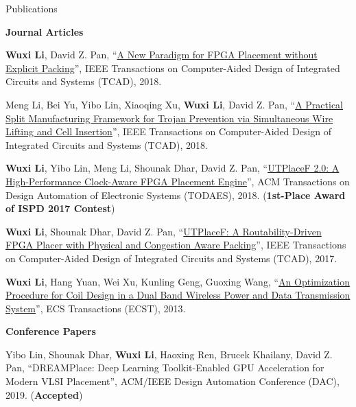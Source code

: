 \begin{rSection}{Publications}

\textbf{Journal Articles}
\begin{description}[font=\normalfont]
\item[{[J5]}]{
    \textbf{Wuxi Li}, David Z. Pan,
    ``\href{https://ieeexplore.ieee.org/document/8500228/}{A New Paradigm for FPGA Placement without Explicit Packing}'',
    IEEE Transactions on Computer-Aided Design of Integrated Circuits and Systems (TCAD), 2018.
}

\item[{[J4]}]{
    Meng Li, Bei Yu, Yibo Lin, Xiaoqing Xu, \textbf{Wuxi Li}, David Z. Pan,
    ``\href{https://ieeexplore.ieee.org/document/8419279/}{A Practical Split Manufacturing Framework for Trojan Prevention via Simultaneous Wire Lifting and Cell Insertion}'',
    IEEE Transactions on Computer-Aided Design of Integrated Circuits and Systems (TCAD), 2018.
}

\item[{[J3]}]{
    \textbf{Wuxi Li}, Yibo Lin, Meng Li, Shounak Dhar, David Z. Pan,
    ``\href{https://dl.acm.org/citation.cfm?id=3174849}{UTPlaceF 2.0: A High-Performance Clock-Aware FPGA Placement Engine}'',
    ACM Transactions on Design Automation of Electronic Systems (TODAES), 2018.
    (\textbf{1st-Place Award of ISPD 2017 Contest})
}

\item[{[J2]}]{
    \textbf{Wuxi Li}, Shounak Dhar, David Z. Pan,
    ``\href{http://ieeexplore.ieee.org/document/7984833/}{UTPlaceF: A Routability-Driven FPGA Placer with Physical and Congestion Aware Packing}'',
    IEEE Transactions on Computer-Aided Design of Integrated Circuits and Systems (TCAD), 2017.
}

\item[{[J1]}]{
    \textbf{Wuxi Li}, Hang Yuan, Wei Xu, Kunling Geng, Guoxing Wang,
    ``\href{http://ecst.ecsdl.org/content/52/1/1091.short}{An Optimization Procedure for Coil Design in a Dual Band Wireless Power and Data Transmission System}'',
    ECS Transactions (ECST), 2013.
}

\end{description}

\textbf{Conference Papers}
\begin{description}[font=\normalfont]
\item[{[C7]}]{
    Yibo Lin, Shounak Dhar, \textbf{Wuxi Li}, Haoxing Ren, Brucek Khailany, David Z. Pan,
    ``DREAMPlace: Deep Learning Toolkit-Enabled GPU Acceleration for Modern VLSI Placement'',
    ACM/IEEE Design Automation Conference (DAC), 2019.
    (\textbf{Accepted})
}


\end{description}
\end{rSection}

